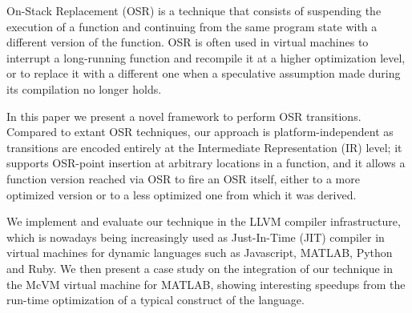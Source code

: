 On-Stack Replacement (OSR) is a technique that consists of suspending the execution of a function and continuing from the same program state with a different version of the function. OSR is often used in virtual machines to interrupt a long-running function and recompile it at a higher optimization level, or to replace it with a different one when a speculative assumption made during its compilation no longer holds.

In this paper we present a novel framework to perform OSR transitions. Compared to extant OSR techniques, our approach is platform-independent as transitions are encoded entirely at the Intermediate Representation (IR) level; it supports OSR-point insertion at arbitrary locations in a function, and it allows a function version reached via OSR to fire an OSR itself, either to a more optimized version or to a less optimized one from which it was derived.

We implement and evaluate our technique in the LLVM compiler infrastructure, which is nowadays being increasingly used as Just-In-Time (JIT) compiler in virtual machines for dynamic languages such as Javascript, MATLAB, Python and Ruby. We then present a case study on the integration of our technique in the McVM virtual machine for MATLAB, showing interesting speedups from the run-time optimization of a typical construct of the language.
  
  
  
  
  
  
  